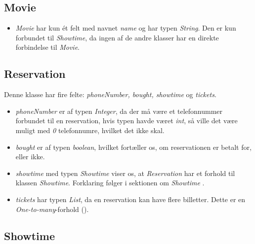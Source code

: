 \subsection{Movie}

\begin{itemize}

  \item \textit{Movie} har kun ét felt med navnet \textit{name} og har typen \textit{String}. Den er kun forbundet til \textit{Showtime}, da ingen af de andre klasser har en direkte forbindelse til \textit{Movie}.

\end{itemize}

\subsection{Reservation}

Denne klasse har fire felte: \textit{phoneNumber, bought, showtime} og \textit{tickets}.

\begin{itemize}
  \item \textit{phoneNumber} er af typen \textit{Integer}, da der må være et telefonnummer forbundet til en reservation, hvis typen havde været \textit{int}, så ville det være muligt med \textit{0} telefonnumre, hvilket det ikke skal.
  \item \textit{bought} er af typen \textit{boolean}, hvilket fortæller os, om reservationen er betalt for, eller ikke. 
  \item \textit{showtime} med typen \textit{Showtime} viser os, at \textit{Reservation} har et forhold til klassen \textit{Showtime}. Forklaring følger i sektionen om \textit{Showtime} .
  \item \textit{tickets} har typen \textit{List}, da en reservation kan have flere billetter. Dette er en \textit{One-to-many}-forhold (\cite{https://learnit.itu.dk/pluginfile.php/114939/mod_resource/content/0/GRPRO-14.pdf}).

\end{itemize}

\subsection{Showtime}

